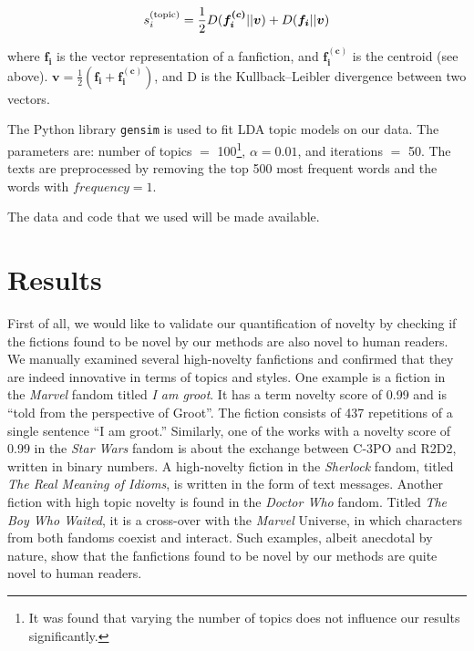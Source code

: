 \documentclass[letterpaper]{article} %
\begin{document}
\begin{equation}
\begin{centering}
s_{i}^{(\mathrm{topic})} = \frac{1}{2}D(\boldsymbol{f_i^{(c)}}\rvert\rvert\boldsymbol{v}) + D(\boldsymbol{f_i}\rvert\rvert\boldsymbol{v})
\end{centering}
\end{equation}

where $\boldsymbol{f_i}$ is the vector representation of a fanfiction, and $\boldsymbol{f_i^{(c)}}$ is the centroid (see above). $\boldsymbol{v} = \frac{1}{2}(\boldsymbol{f_i} + \boldsymbol{f_i^{(c)}})$, and D is the  Kullback–Leibler divergence between two vectors.

The Python library \texttt{gensim} is used to fit LDA topic models on our data. The parameters are: number of topics $=$ 100\footnote{It was found that varying the number of topics does not influence our results significantly.}, $\alpha = 0.01$, and iterations $=$ 50. The texts are preprocessed by removing the top 500 most frequent words and the words with $frequency = 1$.

The data and code that we used will be made available.

\section{Results}
First of all, we would like to validate our quantification of novelty by checking if the fictions found to be novel by our methods are also novel to human readers. We manually examined several high-novelty fanfictions and confirmed that they are indeed innovative in terms of topics and styles. One example is a fiction in the \emph{Marvel} fandom titled \emph{I am groot}. It has a term novelty score of 0.99 and is  ``told from the perspective of Groot''. The fiction consists of 437 repetitions of a single sentence ``I am groot.'' Similarly, one of the works with a novelty score of 0.99 in the \emph{Star Wars} fandom is about the exchange between C-3PO and R2D2, written in binary numbers. A high-novelty fiction in the \emph{Sherlock} fandom, titled \emph{The Real Meaning of Idioms}, is written in the form of text messages.  Another fiction with high topic novelty is found in the \emph{Doctor Who} fandom. Titled \emph{The Boy Who Waited}, it is a cross-over with the \emph{Marvel} Universe, in which characters from both fandoms coexist and interact. Such examples, albeit anecdotal by nature, show that the fanfictions found to be novel by our methods are quite novel to human readers.
\end{document}
